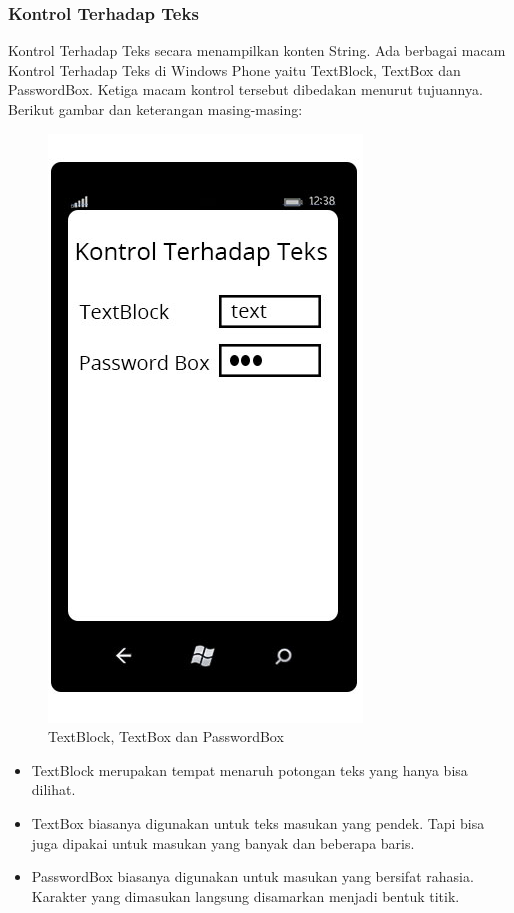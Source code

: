 \subsubsection{Kontrol Terhadap Teks}
\label{subsubsec:Kontrol Terhadap Teks}
\hspace{0.5cm} Kontrol Terhadap Teks  secara menampilkan konten String. Ada berbagai macam Kontrol Terhadap Teks di Windows Phone yaitu TextBlock, TextBox dan PasswordBox. Ketiga macam kontrol tersebut dibedakan menurut tujuannya. Berikut gambar dan keterangan masing-masing:
\begin{figure}[h]
	\centering
		\includegraphics[scale=0.5]{Gambar/Tombol/kontrol_teks}
	\caption{TextBlock, TextBox dan PasswordBox}
	\label{fig:kontrol_teks}
\end{figure}

\begin{itemize}
	\item TextBlock merupakan tempat menaruh potongan teks yang hanya bisa dilihat.
	\item TextBox biasanya digunakan untuk teks masukan yang pendek. Tapi bisa juga dipakai untuk masukan yang banyak dan beberapa baris.
	\item PasswordBox biasanya digunakan untuk masukan yang bersifat rahasia. Karakter yang dimasukan langsung disamarkan menjadi bentuk titik.
\end{itemize}

